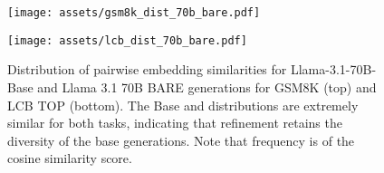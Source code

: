 \begin{figure}[ht]
\vskip 0.2in
\begin{center}
\centerline{\texttt{[image: assets/gsm8k\_dist\_70b\_bare.pdf]}}
\centerline{\texttt{[image: assets/lcb\_dist\_70b\_bare.pdf]}}
\caption{Distribution of pairwise embedding similarities for Llama-3.1-70B-Base and Llama 3.1 70B BARE generations for GSM8K (top) and LCB TOP (bottom). The Base and \Sys{} distributions are extremely similar for both tasks, indicating that refinement retains the diversity of the base generations. Note that frequency is of the cosine similarity score.}
\label{results-bare-diversity}
\end{center}
\vskip -0.2in
\end{figure}
